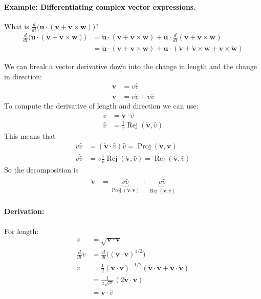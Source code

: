 \documentclass{article}
\renewcommand{\vec}[1]{\boldsymbol{#1}}
\begin{document}
\paragraph{Example: Differentiating complex vector expressions.} What
is $\frac{d}{dt} \big( \vec{u} \cdot (\vec{v} + \vec{v} \times
\vec{w}) \big)$?
\begin{align}
  \frac{d}{dt} \big( \vec{u} \cdot
  (\vec{v} + \vec{v} \times \vec{w}) \big)
  &= \dot{\vec{u}} \cdot 
  (\vec{v} + \vec{v} \times \vec{w})
  + \vec{u} \cdot \frac{d}{dt}
  (\vec{v} + \vec{v} \times \vec{w}) \\
  &= \dot{\vec{u}} \cdot 
  (\vec{v} + \vec{v} \times \vec{w})
  + \vec{u} \cdot (\dot{\vec{v}}
  + \dot{\vec{v}} \times \vec{w} + \vec{v} \times \dot{\vec{w}})
\end{align}

We can break a vector derivative down into the change in length and
the change in direction:
\begin{align}
  \vec{v} &= v \hat{v} \\
  \dot{\vec{v}} &= \dot{v} \hat{v} + v \dot{\hat{v}}
\end{align}
To compute the derivative of length and direction we can use:
\begin{align}
  \dot{v} &= \dot{\vec{v}} \cdot \hat{v} \\
  \hat{v} &= \frac{1}{v} \operatorname{Rej}(\dot{\vec{v}}, \hat{v})
\end{align}
This means that
\begin{align}
  \dot{v} \hat{v} &= (\dot{\vec{v}} \cdot \hat{v}) \hat{v}
  = \operatorname{Proj}(\dot{\vec{v}}, \vec{v}) \\
  v \dot{\hat{v}} &= v \frac{1}{v} \operatorname{Rej}(\dot{\vec{v}}, \hat{v})
  = \operatorname{Rej}(\dot{\vec{v}}, \hat{v})
\end{align}
So the decomposition is
\begin{align}
  \dot{\vec{v}} &= \underbrace{\dot{v}
    \hat{v}}_{\operatorname{Proj}(\dot{\vec{v}}, \vec{v})} +
  \underbrace{v \dot{\hat{v}}}_{\operatorname{Rej}(\dot{\vec{v}},
    \hat{v})}
\end{align}

\paragraph{Derivation:}
For length:
\begin{align}
  v &= \sqrt{\vec{v} \cdot \vec{v}} \\
  \frac{d}{dt} v &= \frac{d}{dt} \big( (\vec{v} \cdot \vec{v})^{1/2} \big) \\
  \dot{v} &= \frac{1}{2} (\vec{v} \cdot \vec{v})^{-1/2}
  (\dot{\vec{v}} \cdot \vec{v} + \vec{v} \cdot \dot{\vec{v}}) \\
  &= \frac{1}{2\sqrt{v^2}} (2 \dot{\vec{v}} \cdot \vec{v}) \\
  &= \dot{\vec{v}} \cdot \hat{v}
\end{align}
\end{document}

